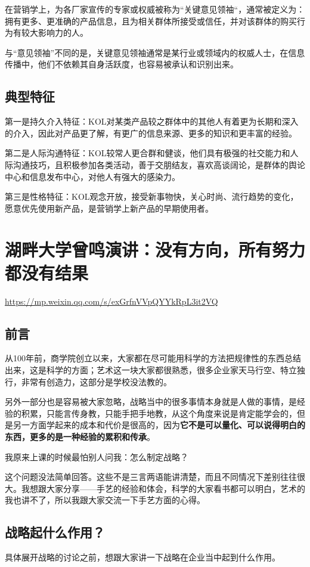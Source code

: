 \documentclass[12pt]{article}
\begin{document}
在营销学上，为各厂家宣传的专家或权威被称为“关键意见领袖“，通常被定义为：拥有更多、更准确的产品信息，且为相关群体所接受或信任，并对该群体的购买行为有较大影响力的人。

与“意见领袖”不同的是，关键意见领袖通常是某行业或领域内的权威人士，在信息传播中，他们不依赖其自身活跃度，也容易被承认和识别出来。

\subsection{典型特征}
第一是持久介入特征：KOL对某类产品较之群体中的其他人有着更为长期和深入的介入，因此对产品更了解，有更广的信息来源、更多的知识和更丰富的经验。

第二是人际沟通特征：KOL较常人更合群和健谈，他们具有极强的社交能力和人际沟通技巧，且积极参加各类活动，善于交朋结友，喜欢高谈阔论，是群体的舆论中心和信息发布中心，对他人有强大的感染力。

第三是性格特征：KOL观念开放，接受新事物快，关心时尚、流行趋势的变化，愿意优先使用新产品，是营销学上新产品的早期使用者。

\section{湖畔大学曾鸣演讲：没有方向，所有努力都没有结果}
\url{https://mp.weixin.qq.com/s/exGrfnVVpQYYkRpL3it2VQ}
\subsection{前言}
从100年前，商学院创立以来，大家都在尽可能用科学的方法把规律性的东西总结出来，这是科学的方面；艺术这一块大家都很熟悉，很多企业家天马行空、特立独行，非常有创造力，这部分是学校没法教的。

另外一部分也是容易被大家忽略，战略当中的很多事情本身就是人做的事情，是经验的积累，只能言传身教，只能手把手地教，从这个角度来说是肯定能学会的，但是另一方面学起来的成本和代价是很高的，因为\textbf{它不是可以量化、可以说得明白的东西，更多的是一种经验的累积和传承}。

我原来上课的时候最怕别人问我：怎么制定战略？

这个问题没法简单回答。这些不是三言两语能讲清楚，而且不同情况下差别往往很大。我想跟大家分享——手艺的经验和体会，科学的大家看书都可以明白，艺术的我也讲不了，所以我跟大家交流一下手艺方面的心得。

\subsection{战略起什么作用？}
具体展开战略的讨论之前，想跟大家讲一下战略在企业当中起到什么作用。
\end{document}

